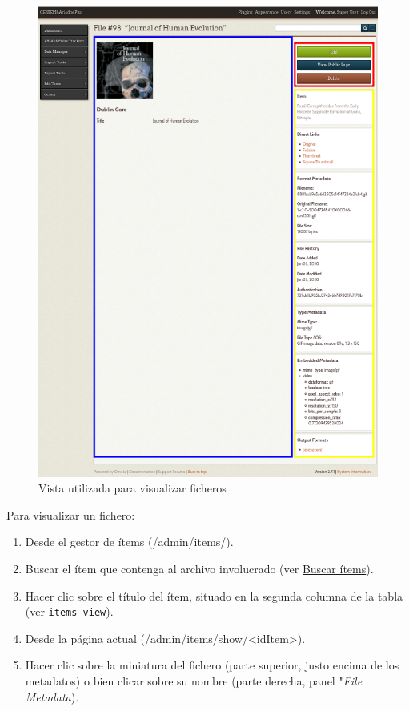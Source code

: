 \documentclass[
]{article}
\providecommand{\tightlist}{%
  \setlength{\itemsep}{0pt}\setlength{\parskip}{0pt}}
\begin{document}
\begin{figure}
\hypertarget{show-files-view}{%
\centering
\includegraphics{../_static/images/show-files-view.png}
\caption{Vista utilizada para visualizar
ficheros}\label{show-files-view}
}
\end{figure}

Para visualizar un fichero:

\begin{enumerate}
\def\labelenumi{\arabic{enumi}.}
\tightlist
\item
  Desde el gestor de ítems ({/admin/items/}).
\item
  Buscar el ítem que contenga al archivo involucrado (ver
  \protect\hyperlink{buscar-uxedtems}{Buscar ítems}).
\item
  Hacer clic sobre el título del ítem, situado en la segunda columna de
  la tabla (ver \texttt{items-view}).
\item
  Desde la página actual
  ({/admin/items/show/\textless idItem\textgreater{}}).
\item
  Hacer clic sobre la miniatura del fichero (parte superior, justo
  encima de los metadatos) o bien clicar sobre su nombre (parte derecha,
  panel "\emph{File Metadata}).
\end{enumerate}
\end{document}
